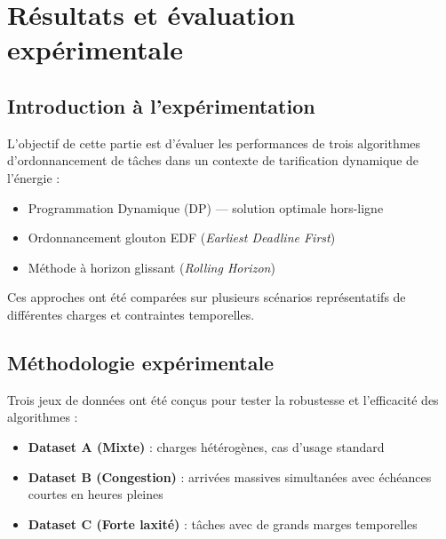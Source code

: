 \documentclass[12pt,a4paper]{report}
\begin{document}

\chapter{Résultats et évaluation expérimentale}
\label{chap:resultats-exp}

\section{Introduction à l’expérimentation}

L’objectif de cette partie est d’évaluer les performances de trois algorithmes d’ordonnancement de tâches dans un contexte de tarification dynamique de l’énergie :

\begin{itemize}
    \item Programmation Dynamique (DP) — solution optimale hors-ligne
    \item Ordonnancement glouton EDF (\textit{Earliest Deadline First})
    \item Méthode à horizon glissant (\textit{Rolling Horizon})
\end{itemize}

Ces approches ont été comparées sur plusieurs scénarios représentatifs de différentes charges et contraintes temporelles.

\section{Méthodologie expérimentale}

Trois jeux de données ont été conçus pour tester la robustesse et l’efficacité des algorithmes :

\begin{itemize}
    \item \textbf{Dataset A (Mixte)} : charges hétérogènes, cas d’usage standard
    \item \textbf{Dataset B (Congestion)} : arrivées massives simultanées avec échéances courtes en heures pleines
    \item \textbf{Dataset C (Forte laxité)} : tâches avec de grands marges temporelles
\end{itemize}
\end{document}
